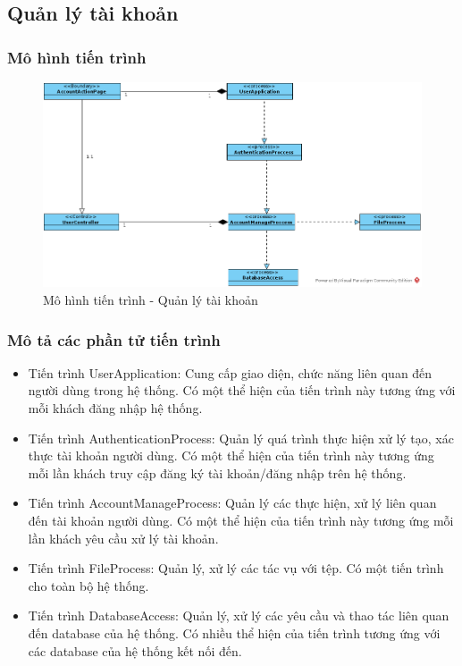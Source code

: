 \documentclass[./../main.tex]{subfiles}
\begin{document}
\subsection{Quản lý tài khoản}

\subsubsection{Mô hình tiến trình}

\begin{figure}[H]
	\centering
	\includegraphics[width=\linewidth]{./images/pv_account_manage.png}
\caption{Mô hình tiến trình - Quản lý tài khoản}

\end{figure}

\subsubsection{Mô tả các phần tử tiến trình}
\begin{itemize}
	\item Tiến trình UserApplication: Cung cấp giao diện, chức năng liên quan đến người dùng trong hệ thống. Có một thể hiện của tiến trình này tương ứng với mỗi khách đăng nhập hệ thống.
	\item Tiến trình AuthenticationProcess: Quản lý quá trình thực hiện xử lý tạo, xác thực tài khoản người dùng.
	Có một thể hiện của tiến trình này tương ứng mỗi lần khách truy cập đăng ký tài khoản/đăng nhập trên hệ thống.
\item Tiến trình AccountManageProcess: Quản lý các thực hiện, xử lý liên quan đến tài khoản người dùng.
	Có một thể hiện của tiến trình này tương ứng mỗi lần khách yêu cầu xử lý tài khoản.
	\item Tiến trình FileProcess: Quản lý, xử lý các tác vụ với tệp.
	Có một tiến trình cho toàn bộ hệ thống.
	\item Tiến trình DatabaseAccess: Quản lý, xử lý các yêu cầu và thao tác liên quan đến database của hệ thống. Có nhiều thể hiện của tiến trình tương ứng với các database của hệ thống kết nối đến.
\end{itemize}
\end{document}
